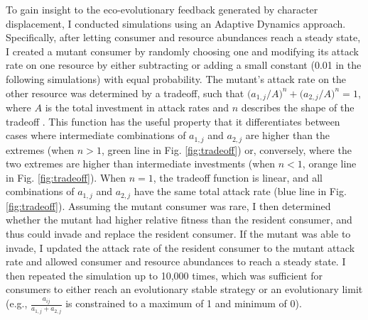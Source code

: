 \documentclass[11pt,]{article}
\begin{document}
To gain insight to the eco-evolutionary feedback generated by character
displacement, I conducted simulations using an Adaptive Dynamics
approach. Specifically, after letting consumer and resource abundances
reach a steady state, I created a mutant consumer by randomly choosing
one and modifying its attack rate on one resource by either subtracting
or adding a small constant (0.01 in the following simulations) with
equal probability. The mutant's attack rate on the other resource was
determined by a tradeoff, such that
\(\big(a_{\text{1},j}/{A}\big)^n+\big(a_{\text{2},j}/{A}\big)^n=1\),
where \(A\) is the total investment in attack rates and \(n\) describes
the shape of the tradeoff \citep{Sargent2006}. This function has the
useful property that it differentiates between cases where intermediate
combinations of \(a_{\text{1},j}\) and \(a_{\text{2},j}\) are higher
than the extremes (when \(n>1\), green line in Fig. \ref{fig:tradeoff})
or, conversely, where the two extremes are higher than intermediate
investments (when \(n<1\), orange line in Fig. \ref{fig:tradeoff}). When
\(n=1\), the tradeoff function is linear, and all combinations of
\(a_{\text{1},j}\) and \(a_{\text{2},j}\) have the same total attack
rate (blue line in Fig. \ref{fig:tradeoff}). Assuming the mutant
consumer was rare, I then determined whether the mutant had higher
relative fitness than the resident consumer, and thus could invade and
replace the resident consumer. If the mutant was able to invade, I
updated the attack rate of the resident consumer to the mutant attack
rate and allowed consumer and resource abundances to reach a steady
state. I then repeated the simulation up to 10,000 times, which was
sufficient for consumers to either reach an evolutionary stable strategy
\citep[ESS,][]{Smith1973} or an evolutionary limit (e.g.,
\(\frac{a_{ij}}{a_{\text{1},j}+a_{\text{2},j}}\) is constrained to a
maximum of 1 and minimum of 0).
\end{document}
